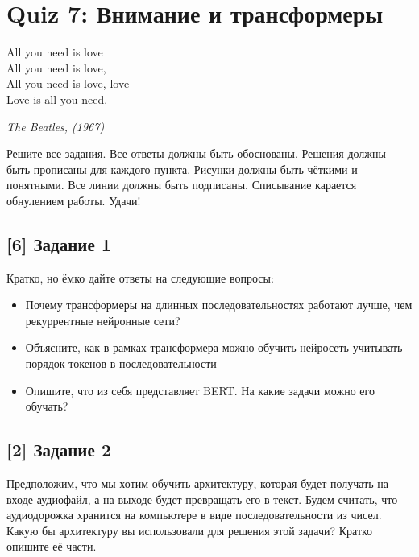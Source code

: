 \documentclass[12pt, a4paper, oneside]{article}
\begin{document}
\section*{Quiz 7: Внимание и трансформеры}

\epigraph{All you need is love \\ All you need is love, \\ All you need is love, love\\ Love is all you need.}{\textit{The Beatles, (1967)}}

Решите все задания. Все ответы должны быть обоснованы. Решения должны быть прописаны для каждого пункта. Рисунки должны быть чёткими и понятными. Все линии должны быть подписаны. Списывание карается обнулением работы.  Удачи! 

\vspace{-0.5cm}
\subsection*{[6] Задание 1}
\vspace{-0.5cm}
Кратко, но ёмко дайте ответы на следующие вопросы:
\begin{itemize} 
    \item  Почему трансформеры на длинных последовательностях работают лучше, чем рекуррентные нейронные сети? 
    
    \item  Объясните, как в рамках трансформера можно обучить нейросеть учитывать порядок токенов в последовательности
    
    \item  Опишите, что из себя представляет BERT. На какие задачи можно его обучать? 
\end{itemize} 


\vspace{-0.5cm}
\subsection*{[2] Задание 2}
\vspace{-0.5cm}

Предположим, что мы хотим обучить архитектуру, которая будет получать на входе аудиофайл, а на выходе будет превращать его в текст. Будем считать, что аудиодорожка хранится на компьютере в виде последовательности из чисел. Какую бы архитектуру вы использовали для решения этой задачи? Кратко опишите её части. 


\vspace{-0.5cm}
\end{document}
